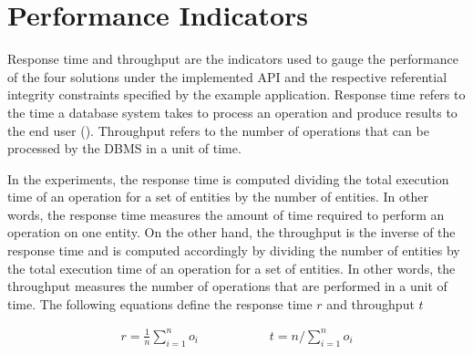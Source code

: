 \section{Performance Indicators} \label{sexp:PerformanceIndicators}

Response time and throughput are the indicators used to gauge the
performance of the four solutions under the implemented \ac{API} and the
respective referential integrity constraints specified by the example
application. Response time refers to the time a database system
  takes to process an operation and produce results to the end
 user (). Throughput 
 refers to  the number of operations that can be processed by the \ac{DBMS}
  in a unit of time.

In the experiments, the response time is computed dividing the total execution
time of an operation for a set of entities by the number of entities. In other
words, the response time measures the amount of time required to perform an
operation on one entity. On the other hand, the throughput is the inverse of the
response time and is computed accordingly by dividing the number of entities by
the total execution time of an operation for a set of entities. In other words,
the throughput measures the number of operations that are performed in a unit
of time. The following equations define the response time $r$ and throughput $t$ 
 


\begin{equation*}
\begin{gathered}
\displaystyle r = \frac{1}{n}\sum_{i = 1}^{n}{o_i}
\end{gathered} \hspace{2cm}
\begin{gathered}
t = n / \sum_{i = 1}^{n}{o_i}  
\end{gathered}
\end{equation*}

% 	 

